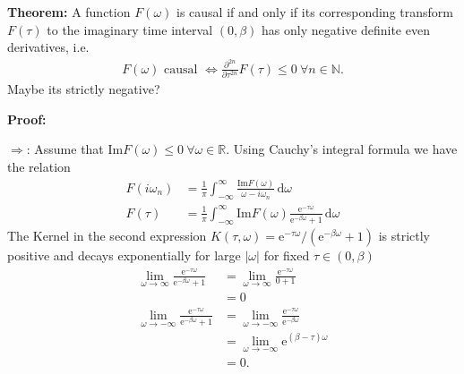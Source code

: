 \documentclass[12pt,a4paper]{scrartcl}
\numberwithin{equation}{section}
\newcommand{\cng}[1]{{\color{red}#1}}
\begin{document}
\textbf{Theorem:}
A function $F(\omega)$ is causal if and only if its corresponding
transform $F(\tau)$ to the imaginary time interval $(0,\beta)$
has only negative definite even derivatives, i.e.
\begin{align}
F(\omega) \mbox{ causal }
%
\Leftrightarrow
%
\frac{\partial^{2n} }{\partial \tau^{2n}} F(\tau) \leq 0 \ \forall n\in\mathbb{N}.
\end{align}
\cng{Maybe its strictly negative?}

\textbf{Proof:}

$\Rightarrow$: Assume that $\mathrm{Im}F(\omega) \leq 0 \  \forall \omega \in \mathbb{R}$.
Using Cauchy's integral formula we have the relation
\begin{align}
F(i\omega_n) &= \frac{1}{\pi} \int_{-\infty}^{\infty} 
                \frac{\mathrm{Im}F(\omega)}{\omega - i\omega_n}\, \mathrm{d}\omega\\
%
F(\tau) &= \frac{1}{\pi} \int_{-\infty}^{\infty} 
          \mathrm{Im}F(\omega) \frac{\mathrm{e}^{-\tau\omega}}{\mathrm{e}^{-\beta\omega}+1}
          \, \mathrm{d}\omega                
\end{align}
The Kernel in the second expression 
$K(\tau,\omega) = \mathrm{e}^{-\tau\omega}/ \left( \mathrm{e}^{-\beta\omega}+1 \right)$
is strictly positive and  decays exponentially for
large $|\omega|$ for fixed $\tau\in (0,\beta)$
\begin{align}
\lim\limits_{\omega\rightarrow \infty} 
 \frac{\mathrm{e}^{-\tau\omega}}{\mathrm{e}^{-\beta\omega}+1}  
 &= \lim\limits_{\omega\rightarrow \infty} 
 \frac{\mathrm{e}^{-\tau\omega}}{0+1} \\
  &= 0 \\
 \lim\limits_{\omega\rightarrow -\infty} 
 \frac{\mathrm{e}^{-\tau\omega}}{\mathrm{e}^{-\beta\omega}+1}  
 &= \lim\limits_{\omega\rightarrow -\infty} 
 \frac{\mathrm{e}^{-\tau\omega}}{\mathrm{e}^{-\beta\omega}}   \\
 &= \lim\limits_{\omega\rightarrow -\infty} 
\mathrm{e}^{(\beta-\tau)\omega} \\
&= 0.
\end{align}
\end{document}
